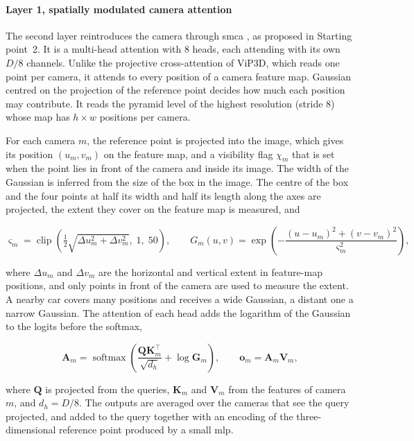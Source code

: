 \paragraph{Layer 1, spatially modulated camera attention}
\label{subsec:design-layer1}

The second layer reintroduces the camera through \ac{smca} \cite{Gao2021SMCA}, as proposed in Starting
point~2. It is a multi-head attention with 8 heads, each attending with its own $D/8$ channels. Unlike the
projective cross-attention of ViP3D, which reads one point per camera, it attends to every position of a camera
feature map. Gaussian centred on the projection of the reference point decides
how much each position may contribute. It reads the pyramid level of the highest resolution (stride 8) whose map has
$h \times w$ positions per camera.

For each camera $m$, the reference point is projected into the image, which gives its position
$(u_m, v_m)$ on the feature map, and a visibility flag $\chi_m$ that is set when the point lies in front of
the camera and inside its image. The width of the Gaussian is inferred from the size of the box in the image. The centre of the box
and the four points at half its width and half its length along the axes are projected, the extent they
cover on the feature map is measured, and


\begin{equation}
    \varsigma_m = \operatorname{clip}\!\left( \tfrac{1}{2} \sqrt{\Delta u_m^2 + \Delta v_m^2},\;
    1,\; 50 \right), \qquad
    G_m(u, v) = \exp\!\left( -\frac{(u - u_m)^2 + (v - v_m)^2}{\varsigma_m^2} \right),
    \label{eq:design-sigma}
\end{equation}

where $\Delta u_m$ and $\Delta v_m$ are the horizontal and vertical extent in feature-map positions,
and only points in front of the camera are used to measure the extent. A nearby car
covers many positions and receives a wide Gaussian, a distant one a narrow Gaussian. The attention of each
head adds the logarithm of the Gaussian to the logits before the softmax,

\begin{equation}
    \mathbf{A}_m = \operatorname{softmax}\!\left( \frac{\mathbf{Q} \mathbf{K}_m^{\top}}{\sqrt{d_h}} +
    \log \mathbf{G}_m \right), \qquad
    \mathbf{o}_m = \mathbf{A}_m \mathbf{V}_m,
    \label{eq:design-smca}
\end{equation}

where $\mathbf{Q}$ is projected from the queries, $\mathbf{K}_m$ and $\mathbf{V}_m$ from the features of
camera $m$, and $d_h = D / 8$. The outputs are averaged
over the cameras that see the query projected, and added to the query together with an encoding of the three-dimensional reference point
produced by a small \ac{mlp}. 


